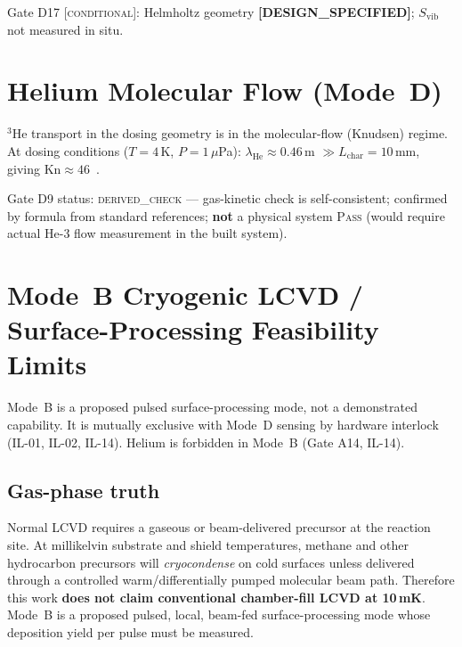 \documentclass[12pt,a4paper]{article}
\newcommand{\conditional}{\textsc{conditional}}
\newcommand{\derivedcheck}{\textsc{derived\_check}}
\newcommand{\designspec}{\textbf{[DESIGN\_SPECIFIED]}}
\begin{document}
Gate D17 [\conditional{}]: Helmholtz geometry \designspec{}; $S_\mathrm{vib}$ not measured in situ.

\section{Helium Molecular Flow (Mode~D)}
\label{sec:flow}

$^3$He transport in the dosing geometry is in the molecular-flow (Knudsen) regime.
At dosing conditions ($T=4$\,K, $P=1\,\mu$Pa):
$\lambda_\mathrm{He} \approx 0.46$\,m $\gg L_\mathrm{char} = 10$\,mm,
giving $\mathrm{Kn} \approx 46$~\cite{Bird1994,Roth1990}.

Gate D9 status: \derivedcheck{} --- gas-kinetic check is self-consistent;
confirmed by formula from standard references; \textbf{not} a physical system
\textsc{Pass} (would require actual He-3 flow measurement in the built system).

\section{Mode~B Cryogenic LCVD / Surface-Processing Feasibility Limits}
\label{sec:lcvd}

Mode~B is a proposed pulsed surface-processing mode, not a demonstrated capability.
It is mutually exclusive with Mode~D sensing by hardware interlock (IL-01, IL-02, IL-14).
Helium is forbidden in Mode~B (Gate A14, IL-14).

\subsection*{Gas-phase truth}
Normal LCVD requires a gaseous or beam-delivered precursor at the reaction site.
At millikelvin substrate and shield temperatures, methane and other hydrocarbon
precursors will \emph{cryocondense} on cold surfaces unless delivered through a
controlled warm/differentially pumped molecular beam path. Therefore this work
\textbf{does not claim conventional chamber-fill LCVD at 10\,mK}.
Mode~B is a proposed pulsed, local, beam-fed surface-processing mode whose
deposition yield per pulse must be measured.
\end{document}
